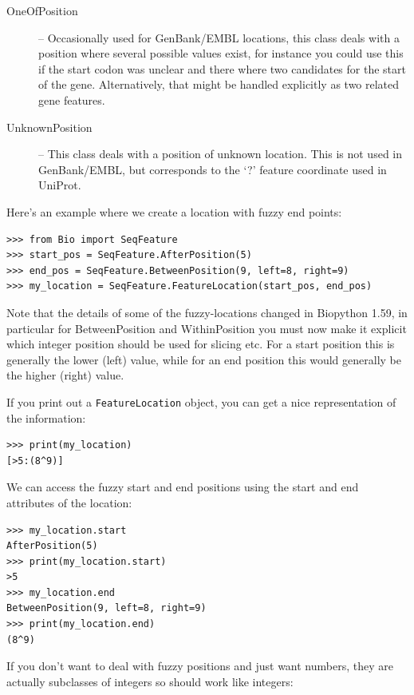 \documentclass{report}
\begin{document}
\begin{description}
  \item[OneOfPosition] -- Occasionally used for GenBank/EMBL locations,
  this class deals with a position where several possible values exist,
  for instance you could use this if the start codon was unclear and
  there where two candidates for the start of the gene. Alternatively,
  that might be handled explicitly as two related gene features.

  \item[UnknownPosition] -- This class deals with a position of unknown
  location. This is not used in GenBank/EMBL, but corresponds to the `?'
  feature coordinate used in UniProt.

\end{description}

Here's an example where we create a location with fuzzy end points:

\begin{verbatim}
>>> from Bio import SeqFeature
>>> start_pos = SeqFeature.AfterPosition(5)
>>> end_pos = SeqFeature.BetweenPosition(9, left=8, right=9)
>>> my_location = SeqFeature.FeatureLocation(start_pos, end_pos)
\end{verbatim}

Note that the details of some of the fuzzy-locations changed in Biopython 1.59,
in particular for BetweenPosition and WithinPosition you must now make it explicit
which integer position should be used for slicing etc. For a start position this
is generally the lower (left) value, while for an end position this would generally
be the higher (right) value.

If you print out a \verb|FeatureLocation| object, you can get a nice representation of the information:

\begin{verbatim}
>>> print(my_location)
[>5:(8^9)]
\end{verbatim}

We can access the fuzzy start and end positions using the start and end attributes of the location:

\begin{verbatim}
>>> my_location.start
AfterPosition(5)
>>> print(my_location.start)
>5
>>> my_location.end
BetweenPosition(9, left=8, right=9)
>>> print(my_location.end)
(8^9)
\end{verbatim}

If you don't want to deal with fuzzy positions and just want numbers,
they are actually subclasses of integers so should work like integers:
\end{document}
